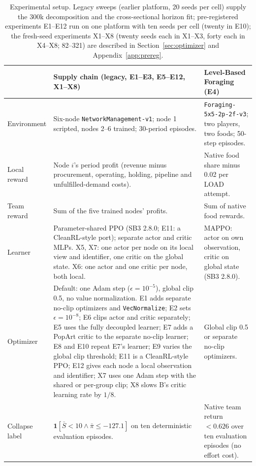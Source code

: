 \begin{table}[t]
\caption{Experimental setup. Legacy sweeps (earlier platform, 20 seeds per cell) supply the 300k decomposition and the cross-sectional horizon fit; pre-registered experiments E1--E12 run on one platform with ten seeds per cell (twenty in E10); the fresh-seed experiments X1--X8 (twenty seeds each in X1--X3, forty each in X4--X8; 82--321) are described in Section~\ref{sec:optimizer} and Appendix~\ref{app:prereg}.}
\label{tab:setup}
\centering\scriptsize
\begin{tabular}{@{}>{\raggedright\arraybackslash}p{}>{\raggedright\arraybackslash}p{}>{\raggedright\arraybackslash}p{}@{}}
\toprule
 & Supply chain (legacy, E1--E3, E5--E12, X1--X8) & Level-Based Foraging (E4) \\
\midrule
Environment & Six-node \texttt{NetworkManagement-v1}; node 1 scripted, nodes 2--6 trained; 30-period episodes. & \texttt{Foraging-5x5-2p-2f-v3}; two players, two foods; 50-step episodes. \\
Local reward & Node $i$'s period profit (revenue minus procurement, operating, holding, pipeline and unfulfilled-demand costs). & Native food share minus 0.02 per LOAD attempt. \\
Team reward & Sum of the five trained nodes' profits. & Sum of native food rewards. \\
Learner & Parameter-shared PPO (SB3 2.8.0; E11: a CleanRL-style port); separate actor and critic MLPs. X5, X7: one actor per node on its local view and identifier, one critic on the global state. X6: one actor and one critic per node, both local. & MAPPO: actor on own observation, critic on global state (SB3 2.8.0). \\
Optimizer & Default: one Adam step ($\epsilon=10^{-5}$), global clip 0.5, no value normalization. E1 adds separate no-clip optimizers and \texttt{VecNormalize}; E2 sets $\epsilon=10^{-8}$; E6 clips actor and critic separately; E5 uses the fully decoupled learner; E7 adds a PopArt critic to the separate no-clip learner; E8 and E10 repeat E7's learner; E9 varies the global clip threshold; E11 is a CleanRL-style PPO; E12 gives each node a local observation and identifier; X7 uses one Adam step with the shared or per-group clip; X8 slows B's critic learning rate by $1/8$. & Global clip 0.5 or separate no-clip optimizers. \\
Collapse label & $\mathbf 1[\bar S<10\wedge\bar\pi\le-127.1]$ on ten deterministic evaluation episodes. & Native team return $<0.626$ over ten evaluation episodes (no effort cost). \\

\end{tabular}
\end{table}
